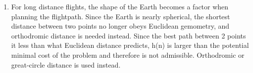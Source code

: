 \documentclass[11pt]{article}
\begin{document}
\begin{enumerate}
\item For long distance flights, the shape of the Earth becomes a factor when planning the flightpath. Since the Earth is nearly spherical, the shortest distance between two points no longer obeys Euclidean gemometry, and orthodromic distance is needed instead. Since the best path between 2 points it less than what Euclidean distance predicts, h(n) is larger than the potential minimal cost of the problem and therefore is not admissible. Orthodromic or great-circle distance is used instead.

\end{enumerate}
\end{document}
